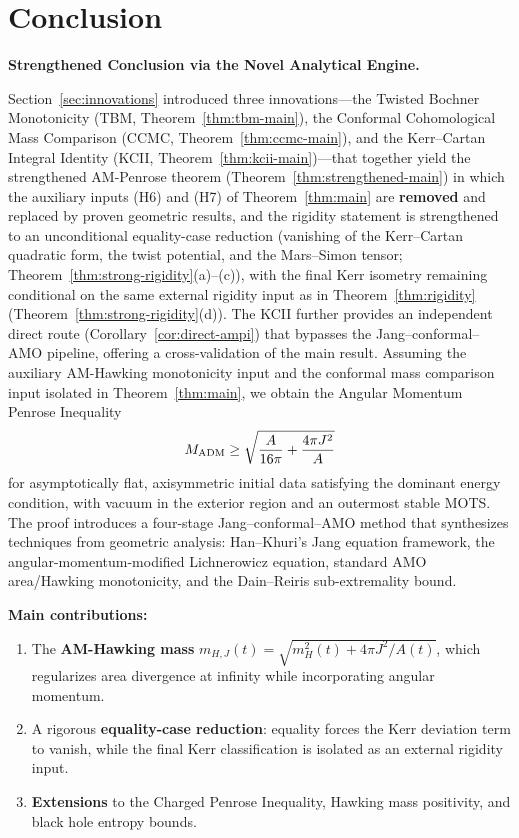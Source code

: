 \section{Conclusion}\label{sec:conclusion}

\textbf{Strengthened Conclusion via the Novel Analytical Engine.}

Section~\ref{sec:innovations} introduced three innovations---the Twisted Bochner Monotonicity (TBM, Theorem~\ref{thm:tbm-main}), the Conformal Cohomological Mass Comparison (CCMC, Theorem~\ref{thm:ccmc-main}), and the Kerr--Cartan Integral Identity (KCII, Theorem~\ref{thm:kcii-main})---that together yield the strengthened AM-Penrose theorem (Theorem~\ref{thm:strengthened-main}) in which the auxiliary inputs (H6) and (H7) of Theorem~\ref{thm:main} are \textbf{removed} and replaced by proven geometric results, and the rigidity statement is strengthened to an unconditional equality-case reduction (vanishing of the Kerr--Cartan quadratic form, the twist potential, and the Mars--Simon tensor; Theorem~\ref{thm:strong-rigidity}(a)--(c)), with the final Kerr isometry remaining conditional on the same external rigidity input as in Theorem~\ref{thm:rigidity} (Theorem~\ref{thm:strong-rigidity}(d)). The KCII further provides an independent direct route (Corollary~\ref{cor:direct-ampi}) that bypasses the Jang--conformal--AMO pipeline, offering a cross-validation of the main result.
Assuming the auxiliary AM-Hawking monotonicity input and the conformal mass comparison input isolated in Theorem~\ref{thm:main}, we obtain the Angular Momentum Penrose Inequality
\[
M_{\mathrm{ADM}} \geq \sqrt{\frac{A}{16\pi} + \frac{4\pi J^2}{A}}
\]
for asymptotically flat, axisymmetric initial data satisfying the dominant energy condition, with vacuum in the exterior region and an outermost stable MOTS. The proof introduces a four-stage Jang--conformal--AMO method that synthesizes techniques from geometric analysis: Han--Khuri's Jang equation framework, the angular-momentum-modified Lichnerowicz equation, standard AMO area/Hawking monotonicity, and the Dain--Reiris sub-extremality bound.

\textbf{Main contributions:}
\begin{enumerate}
    \item The \textbf{AM-Hawking mass} $m_{H,J}(t) = \sqrt{m_H^2(t) + 4\pi J^2/A(t)}$, which regularizes area divergence at infinity while incorporating angular momentum.
    \item A rigorous \textbf{equality-case reduction}: equality forces the Kerr deviation term to vanish, while the final Kerr classification is isolated as an external rigidity input.
    \item \textbf{Extensions} to the Charged Penrose Inequality, Hawking mass positivity, and black hole entropy bounds.
\end{enumerate}

